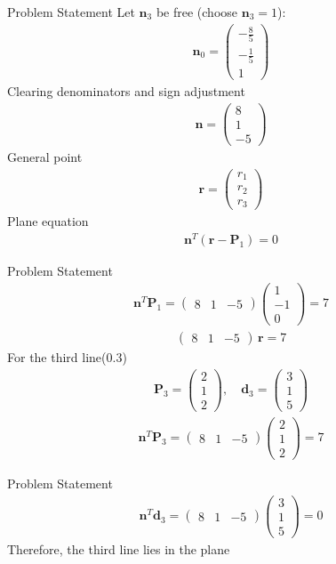 \documentclass{beamer}
\numberwithin{equation}{section}
\theoremstyle{remark}
\newcommand{\myvec}[1]{\ensuremath{\begin{pmatrix}#1\end{pmatrix}}}
\let\vec\mathbf
\begin{document}
\begin{frame}{Problem Statement}
\noindent Let \(\vec{n}_3\) be free (choose \(\vec{n}_3 = 1\)):
\begin{align}
\vec{n}_0 = \myvec{-\frac{8}{5} \\[2mm] -\frac{1}{5} \\[1mm] 1}
\end{align}
\noindent Clearing denominators and sign adjustment
\begin{align}
\vec{n} = \myvec{8\\ 1\\ -5}
\end{align}
\noindent General point
\begin{align}
\vec{r} = \myvec{r_1\\ r_2\\ r_3}
\end{align}
\noindent Plane equation
\begin{align}
\vec{n}^T(\vec{r} - \vec{P}_1) = 0
\end{align}
\end{frame}
\begin{frame}{Problem Statement}
\begin{align}
\vec{n}^T\vec{P}_1 = \myvec{8 & 1 & -5}\myvec{1\\ -1\\ 0} = 7
\end{align}
\begin{align}
\boxed{\myvec{8 & 1 & -5}\,\vec{r} = 7}
\end{align}
\noindent For the third line(0.3)
\begin{align}
\vec{P}_3 = \myvec{2\\1\\2},\quad \vec{d}_3 = \myvec{3\\1\\5}
\end{align}
\begin{align}
\vec{n}^T\vec{P}_3 = \myvec{8 & 1 & -5}\myvec{2\\1\\2} = 7
\end{align}
\end{frame}
\begin{frame}{Problem Statement}
\begin{align}
\vec{n}^T\vec{d}_3 = \myvec{8 & 1 & -5}\myvec{3\\1\\5} = 0
\end{align}
\noindent Therefore, the third line lies in the plane
\end{frame}
\end{document}

